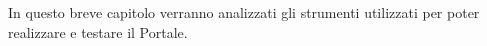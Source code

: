 In questo breve capitolo verranno analizzati gli strumenti utilizzati per poter realizzare e
testare il Portale.
